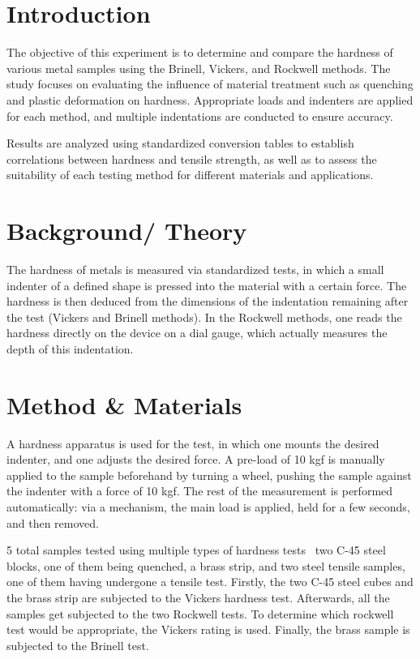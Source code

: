 \documentclass[a4paper]{article}
\begin{document}
\section{Introduction}
The objective of this experiment is to determine and compare the hardness of
various metal samples using the Brinell, Vickers, and Rockwell methods. The
study focuses on evaluating the influence of material treatment such as
quenching and plastic deformation on hardness. Appropriate loads and indenters
are applied for each method, and multiple indentations are conducted to ensure
accuracy.

Results are analyzed using standardized conversion tables to establish correlations between hardness and tensile strength, as well as to assess the suitability of each testing method for different materials and applications.

\section{Background/ Theory}

The hardness of metals is measured via standardized tests, in which a small
indenter of a defined shape is pressed into the material with a certain force.
The hardness is then deduced from the dimensions of the indentation remaining
after the test (Vickers and Brinell methods). In the Rockwell methods, one reads
the hardness directly on the device on a dial gauge, which actually measures the
depth of this indentation.

\section{Method \& Materials}

A hardness apparatus is used for the test, in which one mounts the desired
indenter, and one adjusts the desired force. A pre-load of 10 kgf is manually
applied to the sample beforehand by turning a wheel, pushing the sample against
the indenter with a force of 10 kgf. The rest of the measurement is performed
automatically: via a mechanism, the main load is applied, held for a few
seconds, and then removed.

5 total samples tested using multiple types of hardness tests \textemdash~two
C-45 steel blocks, one of them being quenched, a brass strip, and two steel
tensile samples, one of them having undergone a tensile test. Firstly, the two
C-45 steel cubes and the brass strip are subjected to the Vickers hardness test.
Afterwards, all the samples get subjected to the two Rockwell tests. To
determine which rockwell test would be appropriate, the Vickers rating is used.
Finally, the brass sample is subjected to the Brinell test. 
\newpage
\end{document}
